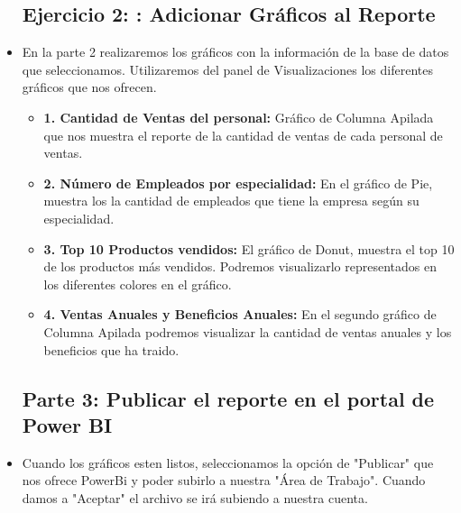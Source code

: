 \begin{itemize}
\subsection{Ejercicio 2: : Adicionar Gráficos al Reporte}
	\item En la parte 2 realizaremos los gráficos con la información de la base de datos que seleccionamos. Utilizaremos del panel de Visualizaciones los diferentes gráficos que nos ofrecen.

\begin{itemize}
	\item{\textbf{1. Cantidad de Ventas del personal: }} Gráfico de Columna Apilada que nos muestra el reporte de la cantidad de ventas de cada personal de ventas.
	\item {\textbf{2. Número de Empleados por especialidad: }}En el gráfico de Pie, muestra los la cantidad de empleados que tiene la empresa según su especialidad.
	\item {\textbf{3. Top 10 Productos vendidos: }}El gráfico de Donut, muestra el top 10 de los productos más vendidos. Podremos visualizarlo representados en los diferentes colores en el gráfico.
	\item {\textbf{4. Ventas Anuales y Beneficios Anuales: }}En el segundo gráfico de Columna Apilada podremos visualizar la cantidad de ventas anuales y los beneficios que ha traido. 
	\end{itemize}

\begin{figure}[h]
	\begin{center}
	\end{center}
	\end{figure}
		
\clearpage

\subsection{Parte 3: Publicar el reporte en el portal de Power BI}
	\item Cuando los gráficos esten listos, seleccionamos la opción de "Publicar" que nos ofrece PowerBi y poder subirlo a nuestra "Área de Trabajo". Cuando damos a "Aceptar" el archivo se irá subiendo a nuestra cuenta.


\end{itemize}
